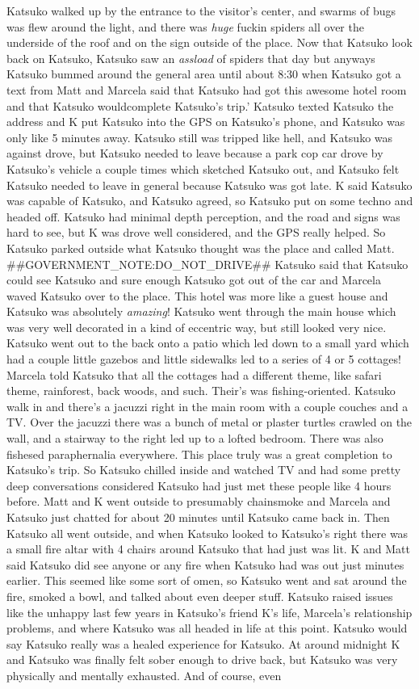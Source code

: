 \documentclass[12pt]{book}
\begin{document}
Katsuko walked up by the entrance to the visitor's center, and swarms of bugs was flew around the light, and there was \emph{huge} fuckin spiders all over the underside of the roof and on the sign outside of the place. Now that Katsuko look back on Katsuko, Katsuko saw an \emph{assload} of spiders that day but anyways Katsuko bummed around the general area until about 8:30 when Katsuko got a text from Matt and Marcela said that Katsuko had got this awesome hotel room and that Katsuko wouldcomplete Katsuko's trip.' Katsuko texted Katsuko the address and K put Katsuko into the GPS on Katsuko's phone, and Katsuko was only like 5 minutes away. Katsuko still was tripped like hell, and Katsuko was against drove, but Katsuko needed to leave because a park cop car drove by Katsuko's vehicle a couple times which sketched Katsuko out, and Katsuko felt Katsuko needed to leave in general because Katsuko was got late. K said Katsuko was capable of Katsuko, and Katsuko agreed, so Katsuko put on some techno and headed off. Katsuko had minimal depth perception, and the road and signs was hard to see, but K was drove well considered, and the GPS really helped. So Katsuko parked outside what Katsuko thought was the place and called Matt. \#\#GOVERNMENT\_NOTE:DO\_NOT\_DRIVE\#\# Katsuko said that Katsuko could see Katsuko and sure enough Katsuko got out of the car and Marcela waved Katsuko over to the place. This hotel was more like a guest house and Katsuko was absolutely \emph{amazing}! Katsuko went through the main house which was very well decorated in a kind of eccentric way, but still looked very nice. Katsuko went out to the back onto a patio which led down to a small yard which had a couple little gazebos and little sidewalks led to a series of 4 or 5 cottages! Marcela told Katsuko that all the cottages had a different theme, like safari theme, rainforest, back woods, and such. Their's was fishing-oriented. Katsuko walk in and there's a jacuzzi right in the main room with a couple couches and a TV. Over the jacuzzi there was a bunch of metal or plaster turtles crawled on the wall, and a stairway to the right led up to a lofted bedroom. There was also fishesed paraphernalia everywhere. This place truly was a great completion to Katsuko's trip. So Katsuko chilled inside and watched TV and had some pretty deep conversations considered Katsuko had just met these people like 4 hours before. Matt and K went outside to presumably chainsmoke and Marcela and Katsuko just chatted for about 20 minutes until Katsuko came back in. Then Katsuko all went outside, and when Katsuko looked to Katsuko's right there was a small fire altar with 4 chairs around Katsuko that had just was lit. K and Matt said Katsuko did see anyone or any fire when Katsuko had was out just minutes earlier. This seemed like some sort of omen, so Katsuko went and sat around the fire, smoked a bowl, and talked about even deeper stuff. Katsuko raised issues like the unhappy last few years in Katsuko's friend K's life, Marcela's relationship problems, and where Katsuko was all headed in life at this point. Katsuko would say Katsuko really was a healed experience for Katsuko. At around midnight K and Katsuko was finally felt sober enough to drive back, but Katsuko was very physically and mentally exhausted. And of course, even 
\end{document}

